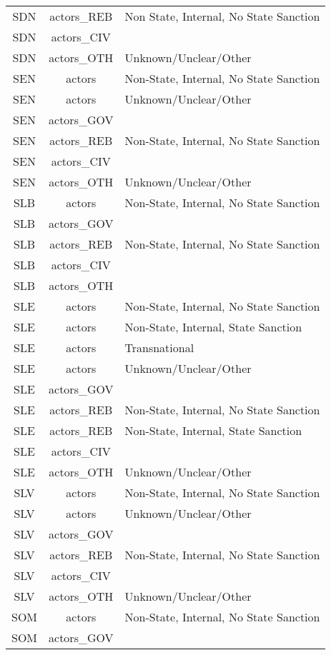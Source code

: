 \documentclass[12pt]{article}
\begin{document}
\begin{center}
\begin{longtable}{|c|c|p{10cm}|}
  SDN & actors\_REB & Non State, Internal, No State Sanction \\ 
  SDN & actors\_CIV &  \\ 
  SDN & actors\_OTH & Unknown/Unclear/Other \\ 
  SEN & actors & Non-State, Internal, No State Sanction \\ 
  SEN & actors & Unknown/Unclear/Other \\ 
  SEN & actors\_GOV &  \\ 
  SEN & actors\_REB & Non-State, Internal, No State Sanction \\ 
  SEN & actors\_CIV &  \\ 
  SEN & actors\_OTH & Unknown/Unclear/Other \\ 
  SLB & actors & Non-State, Internal, No State Sanction \\ 
  SLB & actors\_GOV &  \\ 
  SLB & actors\_REB & Non-State, Internal, No State Sanction \\ 
  SLB & actors\_CIV &  \\ 
  SLB & actors\_OTH &  \\ 
  SLE & actors & Non-State, Internal, No State Sanction \\ 
  SLE & actors & Non-State, Internal, State Sanction \\ 
  SLE & actors & Transnational \\ 
  SLE & actors & Unknown/Unclear/Other \\ 
  SLE & actors\_GOV &  \\ 
  SLE & actors\_REB & Non-State, Internal, No State Sanction \\ 
  SLE & actors\_REB & Non-State, Internal, State Sanction \\ 
  SLE & actors\_CIV &  \\ 
  SLE & actors\_OTH & Unknown/Unclear/Other \\ 
  SLV & actors & Non-State, Internal, No State Sanction \\ 
  SLV & actors & Unknown/Unclear/Other \\ 
  SLV & actors\_GOV &  \\ 
  SLV & actors\_REB & Non-State, Internal, No State Sanction \\ 
  SLV & actors\_CIV &  \\ 
  SLV & actors\_OTH & Unknown/Unclear/Other \\ 
  SOM  & actors & Non-State, Internal, No State Sanction \\ 
  SOM  & actors\_GOV &  \\ 

\end{longtable}
\end{center}
\end{document}
